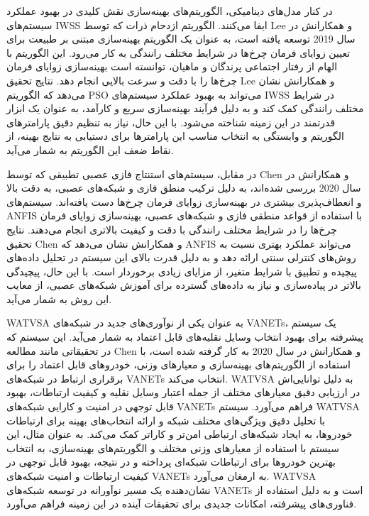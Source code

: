 \documentclass[a4paper,10pt]{article}
\begin{document}
        در کنار مدل‌های دینامیکی، الگوریتم‌های بهینه‌سازی نقش کلیدی در بهبود عملکرد سیستم‌های IWSS ایفا می‌کنند. الگوریتم ازدحام ذرات که توسط Lee و همکارانش در سال 2019 توسعه یافته است، به عنوان یک الگوریتم بهینه‌سازی مبتنی بر طبیعت برای تعیین زوایای فرمان چرخ‌ها در شرایط مختلف رانندگی به کار می‌رود. این الگوریتم با الهام از رفتار اجتماعی پرندگان و ماهیان، توانسته است بهینه‌سازی زوایای فرمان چرخ‌ها را با دقت و سرعت بالایی انجام دهد. نتایج تحقیق Lee و همکارانش نشان می‌دهد که الگوریتم PSO می‌تواند به بهبود عملکرد سیستم‌های IWSS در شرایط مختلف رانندگی کمک کند و به دلیل فرآیند بهینه‌سازی سریع و کارآمد، به عنوان یک ابزار قدرتمند در این زمینه شناخته می‌شود. با این حال، نیاز به تنظیم دقیق پارامترهای الگوریتم و وابستگی به انتخاب مناسب این پارامترها برای دستیابی به نتایج بهینه، از نقاط ضعف این الگوریتم به شمار می‌آید.

        در مقابل، سیستم‌های استنتاج فازی عصبی تطبیقی که توسط Chen و همکارانش در سال 2020 بررسی شده‌اند، به دلیل ترکیب منطق فازی و شبکه‌های عصبی، به دقت بالا و انعطاف‌پذیری بیشتری در بهینه‌سازی زوایای فرمان چرخ‌ها دست یافته‌اند. سیستم‌های ANFIS با استفاده از قواعد منطقی فازی و شبکه‌های عصبی، بهینه‌سازی زوایای فرمان چرخ‌ها را در شرایط مختلف رانندگی با دقت و کیفیت بالاتری انجام می‌دهند. نتایج تحقیق Chen و همکارانش نشان می‌دهد که ANFIS می‌تواند عملکرد بهتری نسبت به روش‌های کنترلی سنتی ارائه دهد و به دلیل قدرت بالای این سیستم در تحلیل داده‌های پیچیده و تطبیق با شرایط متغیر، از مزایای زیادی برخوردار است. با این حال، پیچیدگی بالاتر در پیاده‌سازی و نیاز به داده‌های گسترده برای آموزش شبکه‌های عصبی، از معایب این روش به شمار می‌آید.

        WATVSA به عنوان یکی از نوآوری‌های جدید در شبکه‌های VANETs، یک سیستم پیشرفته برای بهبود انتخاب وسایل نقلیه‌های قابل اعتماد به شمار می‌آید. این سیستم که در تحقیقاتی مانند مطالعه Chen و همکارانش در سال 2020 به کار گرفته شده است، با استفاده از الگوریتم‌های بهینه‌سازی و معیارهای وزنی، خودروهای قابل اعتماد را برای برقراری ارتباط در شبکه‌های VANETs انتخاب می‌کند. WATVSA به دلیل توانایی‌اش در ارزیابی دقیق معیارهای مختلف از جمله اعتبار وسایل نقلیه و کیفیت ارتباطات، بهبود قابل توجهی در امنیت و کارایی شبکه‌های VANETs فراهم می‌آورد. سیستم WATVSA با تحلیل دقیق ویژگی‌های مختلف شبکه و ارائه انتخاب‌های بهینه برای ارتباطات خودروها، به ایجاد شبکه‌های ارتباطی امن‌تر و کاراتر کمک می‌کند. به عنوان مثال، این سیستم با استفاده از معیارهای وزنی مختلف و الگوریتم‌های بهینه‌سازی، به انتخاب بهترین خودروها برای ارتباطات شبکه‌ای پرداخته و در نتیجه، بهبود قابل توجهی در کیفیت ارتباطات و امنیت شبکه‌های VANETs به ارمغان می‌آورد. WATVSA نشان‌دهنده یک مسیر نوآورانه در توسعه شبکه‌های VANETs است و به دلیل استفاده از فناوری‌های پیشرفته، امکانات جدیدی برای تحقیقات آینده در این زمینه فراهم می‌آورد.
\end{document}
